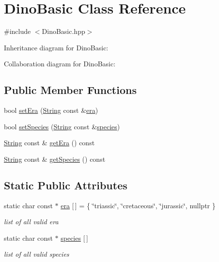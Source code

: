 \hypertarget{classDinoBasic}{}\section{Dino\+Basic Class Reference}
\label{classDinoBasic}


{\ttfamily \#include $<$Dino\+Basic.\+hpp$>$}



Inheritance diagram for Dino\+Basic\+:


Collaboration diagram for Dino\+Basic\+:
\subsection*{Public Member Functions}
\begin{DoxyCompactItemize}
\item 
bool \hyperlink{classDinoBasic_a46451b705931279712c8203384e50c7d}{set\+Era} (\hyperlink{classString}{String} const \&\hyperlink{classDinoBasic_a7ff093a0761137d2f6790c601615369e}{era})
\item 
bool \hyperlink{classDinoBasic_aa2ee84eb530c70058c4b81ec6c879f85}{set\+Species} (\hyperlink{classString}{String} const \&\hyperlink{classDinoBasic_a8d6be833bf21a18219bb65258f8a4eb8}{species})
\item 
\hyperlink{classString}{String} const  \& \hyperlink{classDinoBasic_ad257a3c268719162ac06ba2973386bf7}{get\+Era} () const
\item 
\hyperlink{classString}{String} const  \& \hyperlink{classDinoBasic_ac110aeb95cf5dd50c27c16097f2e46e1}{get\+Species} () const
\end{DoxyCompactItemize}
\subsection*{Static Public Attributes}
\begin{DoxyCompactItemize}
\item 
static char const  $\ast$ \hyperlink{classDinoBasic_a7ff093a0761137d2f6790c601615369e}{era} \mbox{[}$\,$\mbox{]} = \{ \char`\"{}triassic\char`\"{}, \char`\"{}cretaceous\char`\"{}, \char`\"{}jurassic\char`\"{}, nullptr \}
\begin{DoxyCompactList}\small\item\em list of all valid era \end{DoxyCompactList}\item 
static char const  $\ast$ \hyperlink{classDinoBasic_a8d6be833bf21a18219bb65258f8a4eb8}{species} \mbox{[}$\,$\mbox{]}
\begin{DoxyCompactList}\small\item\em list of all valid species \end{DoxyCompactList}\end{DoxyCompactItemize}
